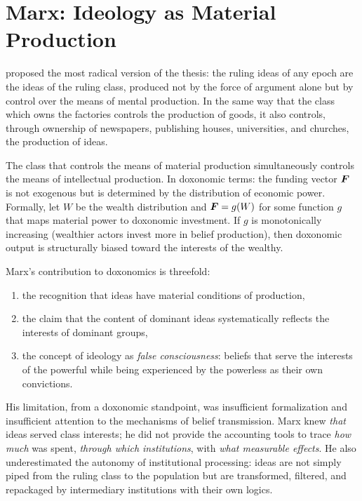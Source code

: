 \section{Marx: Ideology as Material Production}
\label{sec:ch3-marx}

\textcite{marx1846} proposed the most radical version of the thesis: the ruling ideas of any epoch are the ideas of the ruling class, produced not by the force of argument alone but by control over the means of mental production.
In the same way that the class which owns the factories controls the production of goods, it also controls, through ownership of newspapers, publishing houses, universities, and churches, the production of ideas.

\begin{principle}
\label{prin:marx}
The class that controls the means of material production simultaneously controls the means of intellectual production.
In doxonomic terms: the funding vector $\bm{F}$ is not exogenous but is determined by the distribution of economic power.
Formally, let $W$ be the wealth distribution and $\bm{F} = g(W)$ for some function $g$ that maps material power to doxonomic investment.
If $g$ is monotonically increasing (wealthier actors invest more in belief production), then doxonomic output is structurally biased toward the interests of the wealthy.
\end{principle}

Marx's contribution to doxonomics is threefold:
\begin{enumerate}[nosep]
  \item the recognition that ideas have material conditions of production,
  \item the claim that the content of dominant ideas systematically reflects the interests of dominant groups,
  \item the concept of ideology as \emph{false consciousness}: beliefs that serve the interests of the powerful while being experienced by the powerless as their own convictions.
\end{enumerate}

His limitation, from a doxonomic standpoint, was insufficient formalization and insufficient attention to the mechanisms of belief transmission.
Marx knew \emph{that} ideas served class interests; he did not provide the accounting tools to trace \emph{how much} was spent, \emph{through which institutions}, with \emph{what measurable effects}.
He also underestimated the autonomy of institutional processing: ideas are not simply piped from the ruling class to the population but are transformed, filtered, and repackaged by intermediary institutions with their own logics.

